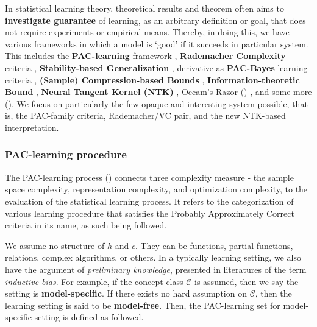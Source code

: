 \documentclass[twoside,10pt]{article}
\begin{document}
In statistical learning theory, theoretical results and theorem often aims to \textbf{investigate guarantee} of learning, as an arbitrary definition or goal, that does not require experiments or empirical means. Thereby, in doing this, we have various frameworks in which a model is `good' if it succeeds in particular system. This includes the \textbf{PAC-learning} framework \cite{10.1145/1968.1972,VapnikChervonenkis:1971}, \textbf{Rademacher Complexity} criteria \cite{BartlettMendelson:2002:Rademacher,BartlettBousquetMendelson:2005:LocalRademacher}, \textbf{Stability-based Generalization} \cite{BousquetElisseeff:2002:Stability}, derivative as \textbf{PAC-Bayes} learning criteria \cite{McAllester:1999:PACBayes}, \textbf{(Sample) Compression-based Bounds} \cite{FloydWarmuth:1995:SampleCompression}, \textbf{Information-theoretic Bound} \cite{RussoZou:2016:InformationTheory,XuRaginsky:2017:InfoGen}, \textbf{Neural Tangent Kernel (NTK)} \cite{Jacot:2018:NTK}, Occam's Razor (\cite{10.5555/200548}) , and some more (\cite{Bartlett:1998:MarginComplexity,XuMannor:2010:RobustnessGeneralization,LittlestoneWarmuth:1994:WeightedMajority}). We focus on particularly the few opaque and interesting system possible, that is, the PAC-family criteria, Rademacher/VC pair, and the new NTK-based interpretation. 

\subsubsection{PAC-learning procedure}

The PAC-learning process (\cite{10.5555/2621980,10.5555/2371238,STL_Hajek_Maxim_2021}) connects three complexity measure - the sample space complexity, representation complexity, and optimization complexity, to the evaluation of the statistical learning process. It refers to the categorization of various learning procedure that satisfies the Probably Approximately Correct criteria in its name, as such being followed. 

We assume no structure of $h$ and $c$. They can be functions, partial functions, relations, complex algorithms, or others. In a typically learning setting, we also have the argument of \textit{preliminary knowledge}, presented in literatures of the term \textit{inductive bias}. For example, if the concept class $\mathcal{C}$ is assumed, then we say the setting is \textbf{model-specific}. If there exists no hard assumption on $\mathcal{C}$, then the learning setting is said to be \textbf{model-free}. Then, the PAC-learning set for model-specific setting is defined as followed. 
\end{document}
